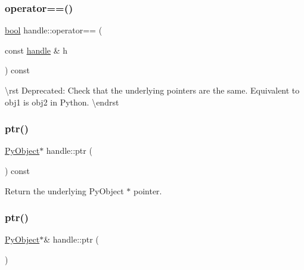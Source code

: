 \mbox{\label{classhandle_a7173e778869746c1c7a071e561c79974}} 
\subsubsection{\texorpdfstring{operator==()}{operator==()}}
{\footnotesize\ttfamily \mbox{\hyperlink{asdl_8h_af6a258d8f3ee5206d682d799316314b1}{bool}} handle\+::operator== (\begin{DoxyParamCaption}\item[{const \mbox{\hyperlink{classhandle}{handle}} \&}]{h }\end{DoxyParamCaption}) const\hspace{0.3cm}{\ttfamily [inline]}}

\textbackslash{}rst Deprecated\+: Check that the underlying pointers are the same. Equivalent to {\ttfamily obj1 is obj2} in Python. \textbackslash{}endrst \mbox{\label{classhandle_afcd412ba4cbffd7d1e3c9338746b2682}} 
\subsubsection{\texorpdfstring{ptr()}{ptr()}\hspace{0.1cm}{\footnotesize\ttfamily [1/2]}}
{\footnotesize\ttfamily \mbox{\hyperlink{_python27_2object_8h_aadc84ac7aed2cfa6f20c25f62bf3dac7}{Py\+Object}}$\ast$ handle\+::ptr (\begin{DoxyParamCaption}{ }\end{DoxyParamCaption}) const\hspace{0.3cm}{\ttfamily [inline]}}



Return the underlying {\ttfamily Py\+Object $\ast$} pointer. 

\mbox{\label{classhandle_aba369bca41a28327a0812fddce26e95a}} 
\subsubsection{\texorpdfstring{ptr()}{ptr()}\hspace{0.1cm}{\footnotesize\ttfamily [2/2]}}
{\footnotesize\ttfamily \mbox{\hyperlink{_python27_2object_8h_aadc84ac7aed2cfa6f20c25f62bf3dac7}{Py\+Object}}$\ast$\& handle\+::ptr (\begin{DoxyParamCaption}{ }\end{DoxyParamCaption})\hspace{0.3cm}{\ttfamily [inline]}}




